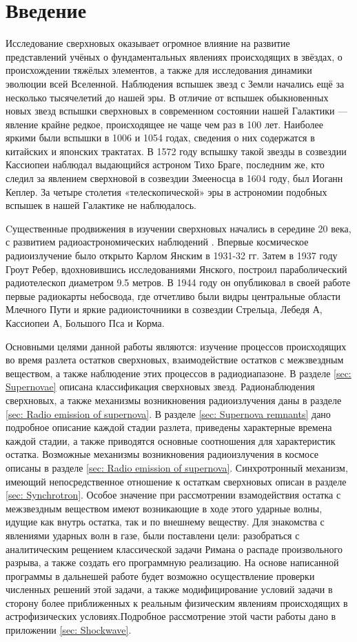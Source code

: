 \documentclass[a4paper,12pt]{extarticle}
\begin{document}
\section{Введение}
Исследование сверхновых  оказывает огромное влияние на развитие представлений учёных о фундаментальных явлениях происходящих в звёздах, о происхождении тяжёлых элементов, а также для исследования динамики эволюции всей Вселенной. 
Наблюдения вспышек звезд с Земли начались ещё за несколько тысячелетий до нашей эры.
В отличие от вспышек обыкновенных новых звезд вспышки сверхновых в современном состоянии нашей Галактики — явление крайне редкое, происходящее не чаще чем раз в 100 лет. Наиболее яркими были вспышки в 1006 и 1054 годах, сведения о них содержатся в китайских и японских трактатах. В 1572 году вспышку такой звезды в созвездии Кассиопеи наблюдал выдающийся астроном Тихо Браге, последним же, кто следил за явлением сверхновой в созвездии Змееносца в 1604 году, был Иоганн Кеплер. За четыре столетия «телескопической» эры в астрономии подобных вспышек в нашей Галактике не наблюдалось.

Cущественные продвижения в изучении сверхновых начались в середине 20 века, с развитием радиоастрономических наблюдений \cite{Kaplan1966}.  
Впервые космическое радиоизлучение было открыто Карлом Янским в 1931-32 гг. Затем в 1937 году Гроут Ребер, вдохновившись исследованиями Янского, построил параболический радиотелескоп диаметром 9.5 метров. В 1944 году он опубликовал в своей работе первые радиокарты небосвода, где отчетливо были видры центральные области Млечного Пути и яркие радиоисточниики в созвездии Стрельца, Лебедя А, Кассиопеи А, Большого Пса и Корма. 

Основными целями данной работы являются: изучение процессов происходящих во время разлета остатков сверхновых, взаимодействие остатков с межзвездным веществом, а также наблюдение этих процессов в радиодиапазоне. В разделе \ref{sec: Supernovae} описана классификация сверхновых звезд. Радионаблюдения сверхновых, а также механизмы возникновения радиоизлучения даны в разделе \ref{sec: Radio emission of supernova}. В разделе \ref{sec: Supernova remnants} дано подробное описание каждой стадии разлета, приведены характерные времена каждой стадии, а также приводятся основные соотношения для характеристик остатка. Возможные механизмы возникновения радиоизлучения в космосе описаны в разделе \ref{sec: Radio emission of supernova}. Синхротронный механизм, имеющий непосредственное отношение к остаткам сверхновых описан в разделе \ref{sec: Synchrotron}.
Особое значение при рассмотрении взамодействия остатка с межзвездным веществом имеют возникающие в ходе этого ударные волны, идущие как внутрь остатка, так и по внешнему веществу. 
Для знакомства с явлениями ударных волн в газе, были поставлени цели: разобраться с аналитическим рещением классической задачи Римана о распаде произвольного разрыва, а также создать его программную реализацию. На основе написанной программы в дальнешей работе будет возможно осуществление проверки численных решений этой задачи, а также модифицирование условий задачи в сторону более приближенных к реальным физическим явлениям происходящих в астрофизических условиях.Подробное рассмотрение этой части работы дано в приложении \ref{sec: Shockwave}. 
\end{document}
